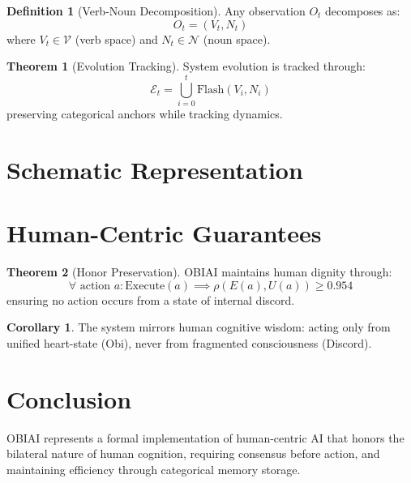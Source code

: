 \documentclass[11pt]{article}
\theoremstyle{definition}
\newtheorem{definition}{Definition}
\newtheorem{theorem}{Theorem}
\newtheorem{corollary}{Corollary}
\begin{document}
\begin{definition}[Verb-Noun Decomposition]
Any observation $O_t$ decomposes as:
\[
O_t = (V_t, N_t)
\]
where $V_t \in \mathcal{V}$ (verb space) and $N_t \in \mathcal{N}$ (noun space).
\end{definition}

\begin{theorem}[Evolution Tracking]
System evolution is tracked through:
\[
\mathcal{E}_t = \bigcup_{i=0}^{t} \text{Flash}(V_i, N_i)
\]
preserving categorical anchors while tracking dynamics.
\end{theorem}

\section{Schematic Representation}

\begin{center}
\end{center}

\section{Human-Centric Guarantees}

\begin{theorem}[Honor Preservation]
OBIAI maintains human dignity through:
\[
\forall \text{ action } a: \text{Execute}(a) \implies \rho(E(a), U(a)) \geq 0.954
\]
ensuring no action occurs from a state of internal discord.
\end{theorem}

\begin{corollary}
The system mirrors human cognitive wisdom: acting only from unified heart-state (Obi), never from fragmented consciousness (Discord).
\end{corollary}

\section{Conclusion}
OBIAI represents a formal implementation of human-centric AI that honors the bilateral nature of human cognition, requiring consensus before action, and maintaining efficiency through categorical memory storage.
\end{document}
